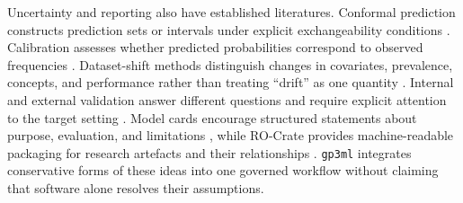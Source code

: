 Uncertainty and reporting also have established literatures. Conformal prediction constructs prediction sets or intervals under explicit exchangeability conditions \citep{Vovk2005, Shafer2008, Angelopoulos2023}. Calibration assesses whether predicted probabilities correspond to observed frequencies \citep{Guo2017}. Dataset-shift methods distinguish changes in covariates, prevalence, concepts, and performance rather than treating ``drift'' as one quantity \citep{QuioneroCandela2009, MorenoTorres2012}. Internal and external validation answer different questions and require explicit attention to the target setting \citep{Steyerberg2016}. Model cards encourage structured statements about purpose, evaluation, and limitations \citep{Mitchell2019}, while RO-Crate provides machine-readable packaging for research artefacts and their relationships \citep{SoilandReyes2022}. \texttt{gp3ml} integrates conservative forms of these ideas into one governed workflow without claiming that software alone resolves their assumptions.

